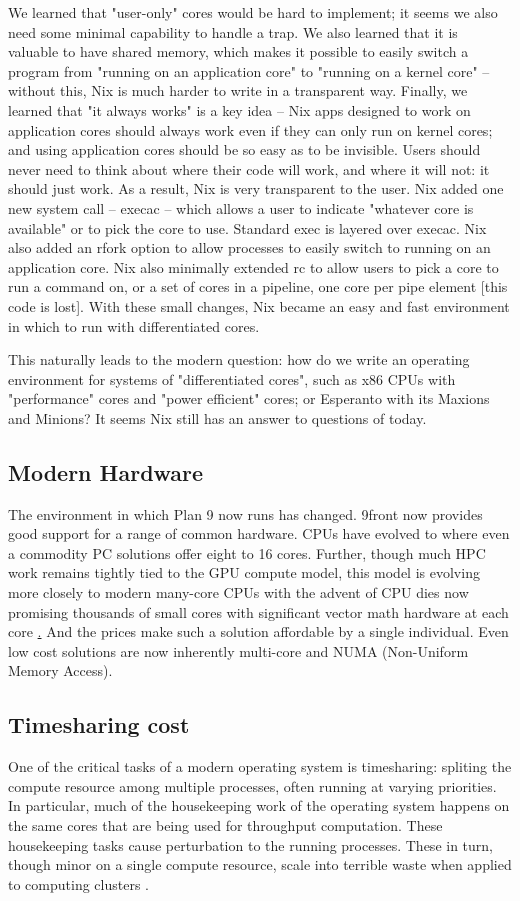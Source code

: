 \documentclass{article}
\begin{document}
We learned that "user-only" cores would be hard to implement; it seems we also need some minimal capability to handle a trap. We also learned that it is valuable to have shared memory, which makes it possible to easily switch a program from "running on an application core" to "running on a kernel core" -- without this, Nix is much harder to write in a transparent way.
Finally, we learned that "it always works" is a key idea -- Nix apps designed to work on application cores should always work even if they can only run on kernel cores; and using application cores should be so easy as to be invisible.
Users should never need to think about where their code will work, and where it will not: it should just work.
As a result, Nix is very transparent to the user.
Nix added one new system call -- execac -- which allows a user to indicate "whatever core is available" or to pick the core to use.
Standard exec is layered over execac.
Nix also added an rfork option to allow processes to easily switch to running on an application core.
Nix also minimally extended rc to allow users to pick a core to run a command on, or a set of cores in a pipeline, one core per pipe element [this code is lost].
With these small changes, Nix became an easy and fast environment in which to run with differentiated cores.

This naturally leads to the modern question: how do we write an operating environment for systems of "differentiated cores", such as x86 CPUs with "performance" cores and "power efficient" cores; or Esperanto with its Maxions and Minions?
It seems Nix still has an answer to questions of today.

\subsection{Modern Hardware}
The environment in which Plan 9 now runs has changed.
9front now provides good support for a range of common hardware.
CPUs have evolved to where even a commodity PC solutions offer eight to 16 cores.
Further, though much HPC work remains tightly tied to the GPU compute model, this model is evolving more closely to modern many-core CPUs with the advent of CPU dies now promising thousands of small cores with significant vector math hardware at each core \href{https://www.esperanto.ai/technology/}.
And the prices make such a solution affordable by a single individual.
Even low cost solutions are now inherently multi-core and NUMA (Non-Uniform Memory Access).

\subsection{Timesharing cost}
One of the critical tasks of a modern operating system is timesharing: spliting the compute resource among multiple processes, often running at varying priorities.
In particular, much of the housekeeping work of the operating system happens on the same cores that are being used for throughput computation.
These housekeeping tasks cause perturbation to the running processes.
These in turn, though minor on a single compute resource, scale into terrible waste when applied to computing clusters \cite{Petrini2003}.
\end{document}
